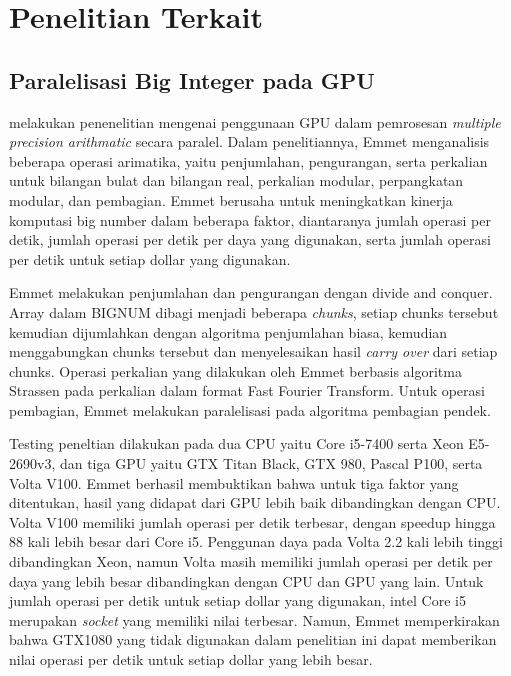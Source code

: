\section{Penelitian Terkait}
\subsection{Paralelisasi Big Integer pada GPU}
\citet{gpu_bignum} melakukan penenelitian mengenai penggunaan GPU dalam pemrosesan \textit{multiple precision arithmatic} secara paralel. Dalam penelitiannya, Emmet menganalisis beberapa operasi arimatika, yaitu penjumlahan, pengurangan, serta perkalian untuk bilangan bulat dan bilangan real, perkalian modular, perpangkatan modular, dan pembagian. Emmet berusaha untuk meningkatkan kinerja komputasi big number dalam beberapa faktor, diantaranya jumlah operasi per detik, jumlah operasi per detik per daya yang digunakan, serta jumlah operasi per detik untuk setiap dollar yang digunakan.

Emmet melakukan penjumlahan dan pengurangan dengan divide and conquer. Array dalam BIGNUM dibagi menjadi beberapa \textit{chunks}, setiap chunks tersebut kemudian dijumlahkan dengan algoritma penjumlahan biasa, kemudian menggabungkan chunks tersebut dan menyelesaikan hasil \textit{carry over} dari setiap chunks. Operasi perkalian yang dilakukan oleh Emmet berbasis algoritma Strassen pada perkalian dalam format Fast Fourier Transform. Untuk operasi pembagian, Emmet melakukan paralelisasi pada algoritma pembagian pendek.


Testing peneltian dilakukan pada dua CPU yaitu Core i5-7400 serta Xeon E5-2690v3, dan tiga GPU yaitu GTX Titan Black, GTX 980, Pascal P100, serta Volta V100. Emmet berhasil membuktikan bahwa untuk tiga faktor yang ditentukan, hasil yang didapat dari GPU lebih baik dibandingkan dengan CPU. Volta V100 memiliki jumlah operasi per detik terbesar, dengan speedup hingga 88 kali lebih besar dari Core i5. Penggunan daya pada Volta 2.2 kali lebih tinggi dibandingkan Xeon, namun Volta masih memiliki jumlah operasi per detik per daya yang lebih besar dibandingkan dengan CPU dan GPU yang lain. Untuk jumlah operasi per detik untuk setiap dollar yang digunakan, intel Core i5 merupakan \textit{socket} yang memiliki nilai terbesar. Namun, Emmet memperkirakan bahwa GTX1080 yang tidak digunakan dalam penelitian ini dapat memberikan nilai operasi per detik untuk setiap dollar yang lebih besar.

